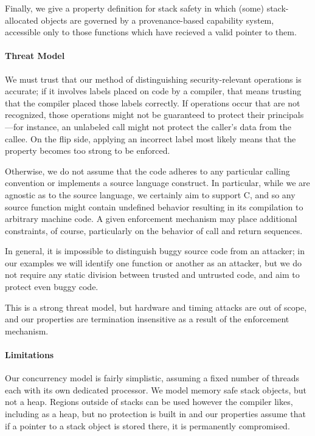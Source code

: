 \documentclass[10pt,conference]{ieeetran}%
\theoremstyle{definition}
\begin{document}
Finally, we give a property definition for stack safety in which (some) stack-allocated
objects are governed by a provenance-based capability system, accessible only to those
functions which have recieved a valid pointer to them.


\paragraph*{Threat Model}

We must trust that our method of distinguishing security-relevant operations is accurate; if it
involves labels placed on code by a compiler, that means trusting that the compiler placed
those labels correctly. If operations occur that are not recognized, those operations
might not be guaranteed to protect their principals---for instance, an unlabeled call
might not protect the caller's data from the callee. On the flip side, applying an incorrect
label most likely means that the property becomes too strong to be enforced.

Otherwise, we do not assume that the code adheres to any particular
calling convention or implements a source language construct.
In particular, while we are agnostic as to the source
language, we certainly aim to support C, and so any source function might contain undefined
behavior resulting in its compilation to arbitrary machine code. A given enforcement
mechanism may place additional constraints, of course, particularly on the behavior of
call and return sequences.

In general, it is impossible to distinguish buggy source code from an attacker; in
our examples we will identify one function or another as an attacker, but we do not
require any static division between trusted and untrusted code, and aim to protect
even buggy code.

This is a strong threat model, but hardware and timing attacks are out of scope,
and our properties are termination insensitive as a result of the enforcement mechanism.

\paragraph*{Limitations}

Our concurrency model is fairly
simplistic, assuming a fixed number of threads each with its own dedicated processor.
We model memory safe stack objects, but not a heap. Regions outside of
stacks can be used however the compiler likes, including as a heap, but no protection is
built in and our properties assume that if a pointer to a stack object is stored there,
it is permanently compromised.
\end{document}
